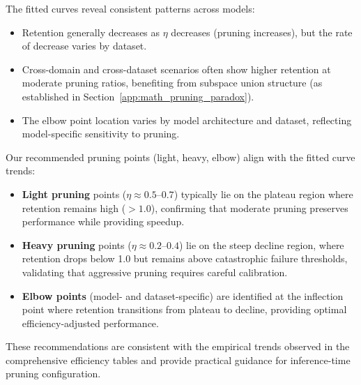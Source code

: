 The fitted curves reveal consistent patterns across models:
\begin{itemize}
    \item Retention generally decreases as $\eta$ decreases (pruning increases), but the rate of decrease varies by dataset.
    \item Cross-domain and cross-dataset scenarios often show higher retention at moderate pruning ratios, benefiting from subspace union structure (as established in Section~\ref{app:math_pruning_paradox}).
    \item The elbow point location varies by model architecture and dataset, reflecting model-specific sensitivity to pruning.
\end{itemize}

Our recommended pruning points (light, heavy, elbow) align with the fitted curve trends:
\begin{itemize}
    \item \textbf{Light pruning} points ($\eta \approx 0.5$--$0.7$) typically lie on the plateau region where retention remains high ($>1.0$), confirming that moderate pruning preserves performance while providing speedup.
    \item \textbf{Heavy pruning} points ($\eta \approx 0.2$--$0.4$) lie on the steep decline region, where retention drops below 1.0 but remains above catastrophic failure thresholds, validating that aggressive pruning requires careful calibration.
    \item \textbf{Elbow points} (model- and dataset-specific) are identified at the inflection point where retention transitions from plateau to decline, providing optimal efficiency-adjusted performance.
\end{itemize}

These recommendations are consistent with the empirical trends observed in the comprehensive efficiency tables and provide practical guidance for inference-time pruning configuration.

